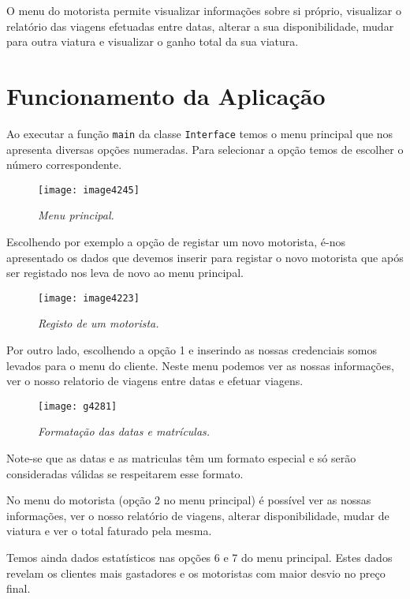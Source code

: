 \documentclass[a4paper,12pt]{report}
\begin{document}
O menu do motorista permite visualizar informações sobre si próprio, visualizar o relatório das viagens efetuadas entre datas, alterar a sua disponibilidade, mudar para outra viatura e visualizar o ganho total da sua viatura.

\section{Funcionamento da Aplicação}

Ao executar a função {\tt main} da classe {\tt Interface} temos o menu principal que nos apresenta diversas opções numeradas. Para selecionar a opção temos de escolher o número correspondente. 

\begin{figure}[h]
	\centering
	\texttt{[image: image4245]}
	\caption{\small\sl Menu principal.}
	\captionsetup[figure]{list=yes}
\end{figure}

Escolhendo por exemplo a opção de registar um novo motorista, é-nos apresentado os dados que devemos inserir para registar o novo motorista que após ser registado nos leva de novo ao menu principal.

\begin{figure}[h]
	\centering
	\texttt{[image: image4223]}
	\caption{\small\sl Registo de um motorista.}
	\captionsetup[figure]{list=yes}
\end{figure}

Por outro lado, escolhendo a opção 1 e inserindo as nossas credenciais somos levados para o menu do cliente. Neste menu podemos ver as nossas informações, ver o nosso relatorio de viagens entre datas e efetuar viagens.

\begin{figure}[h]
	\centering
	\texttt{[image: g4281]}
	\caption{\small\sl Formatação das datas e matrículas.}
	\captionsetup[figure]{list=yes}
\end{figure}

Note-se que as datas e as matriculas têm um formato especial e só serão consideradas válidas se respeitarem esse formato.

No menu do motorista (opção 2 no menu principal) é possível ver as nossas informações, ver o nosso relatório de viagens, alterar disponibilidade, mudar de viatura e ver o total faturado pela mesma. 

Temos ainda dados estatísticos nas opções 6 e 7 do menu principal. Estes dados revelam os clientes mais gastadores e os motoristas com maior desvio no preço final.
\end{document}
